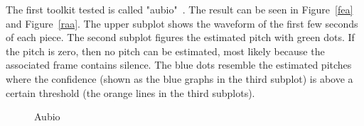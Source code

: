 The first toolkit tested is called "aubio"~\cite{aubio1}. The result can be seen in Figure~\ref{fea} and Figure~\ref{raa}. The upper subplot shows the waveform of the first few seconds of each piece. The second subplot figures the estimated pitch with green dots. If the pitch is zero, then no pitch can be estimated, most likely because the associated frame contains silence. The blue dots resemble the estimated pitches where the confidence (shown as the blue graphs in the third subplot) is above a certain threshold (the orange lines in the third subplots).
\begin{figure}[htbp]
	\centering
	\caption{Aubio}
	\label{fig:aubio}
\end{figure}

